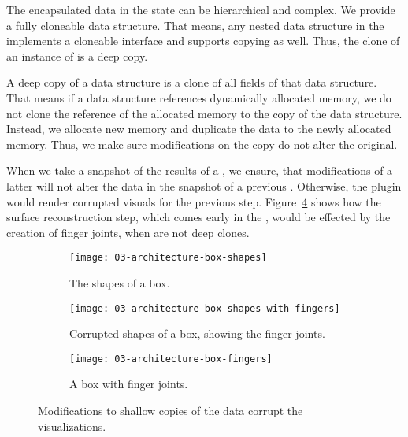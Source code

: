 \documentclass[../../ClassicThesis.tex]{subfiles}
\begin{document}
The encapsulated data in the state can be hierarchical and complex. We
provide a fully cloneable data structure. That means, any nested data
structure in the  implements a cloneable
interface and supports copying as well. Thus, the clone of an instance
of  is a deep copy.

A deep copy of a data structure is a
clone of all fields of that data structure. That means if a
data structure references dynamically allocated memory, we
do not clone the reference of the allocated memory to the
copy of the data structure. Instead, we allocate new memory
and duplicate the data to the newly allocated memory. Thus,
we make sure modifications on the copy do not alter the
original.

When we take a snapshot of the results of a
, we ensure, that modifications of a
latter  will not alter the data in the
snapshot of a previous . Otherwise, the
 plugin would render corrupted visuals for
the previous step. Figure~\ref{fig:corrupt} shows how the surface
reconstruction step, which comes early in the
, would be effected by the creation of finger
joints, when  are not deep clones.

\begin{figure}[h]
  \centering
  \begin{subfigure}[a]{0.3222\textwidth}
    \texttt{[image: 03-architecture-box-shapes]}
    \caption{The shapes of a box.}
    \label{fig:corrupt:shapes}
  \end{subfigure}
  \begin{subfigure}[b]{0.3222\textwidth}
    \texttt{[image: 03-architecture-box-shapes-with-fingers]}
    \caption{Corrupted shapes of a box, showing the finger joints.}
    \label{fig:corrupt:shapes-fingers}
  \end{subfigure}
  \begin{subfigure}[c]{0.3222\textwidth}
    \texttt{[image: 03-architecture-box-fingers]}
    \caption{A box with finger joints.}
    \label{fig:corrupt:fingers}
  \end{subfigure}
  \caption{Modifications to shallow copies of the data
    corrupt the visualizations.}
  \label{fig:corrupt}
\end{figure}


\end{document}
